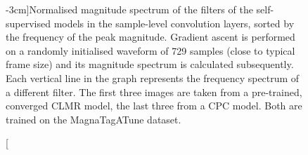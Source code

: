 \begin{figure}
    \caption[][-3cm]{Normalised magnitude spectrum of the filters of the self-supervised models in the sample-level convolution layers, sorted by the frequency of the peak magnitude. Gradient ascent is performed on a randomly initialised waveform of 729 samples (close to typical frame size) and its magnitude spectrum is calculated subsequently. Each vertical line in the graph represents the frequency spectrum of a different filter. The first three images are taken from a pre-trained, converged CLMR model, the last three from a CPC model. Both are trained on the MagnaTagATune dataset.}
    \label{fig:filter_visualisation}
\end{figure}

\begin{figure}
    \centering
    \hfill
    \hfill


\end{figure}

